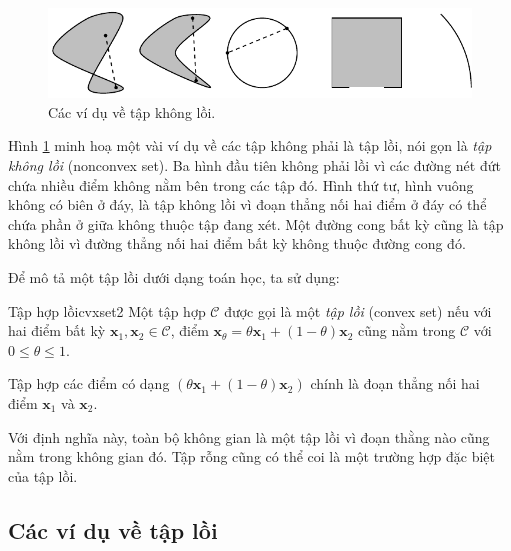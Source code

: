  

\begin{figure}[t]
\centering
    \includegraphics[width = .8\textwidth]{Chapters/08_ConvexOptimization/16_convexity/latex/nonconvexsets.pdf}
    \caption[]{Các ví dụ về tập không lồi.}
    \label{fig:16_nonconvexsets}
\end{figure}

Hình \ref{fig:16_nonconvexsets} minh hoạ một vài ví dụ về các tập không phải là
tập lồi, nói gọn là \textit{tập không lồi} ({nonconvex set}). Ba hình đầu
tiên không phải lồi vì các đường nét đứt chứa nhiều điểm không nằm bên trong các
tập đó. Hình thứ tư, hình vuông không có biên ở đáy, là tập không lồi vì đoạn thẳng nối hai điểm ở đáy có thể chứa phần ở giữa không
thuộc tập đang xét. Một đường cong
bất kỳ cũng là tập không lồi vì đường thẳng nối hai điểm
bất kỳ không thuộc đường cong đó.
 
Để mô tả một {tập lồi} dưới dạng toán học, ta sử dụng:

\begin{mydef}{Tập hợp lồi}{cvxset2}
Một tập hợp $\mathcal{C}$ được gọi là một {\textit{tập lồi}} (convex set) nếu với hai điểm bất
kỳ $\mathbf{x}_1, \mathbf{x}_2 \in \mathcal{C}$, điểm $ \mathbf{x}_{\theta} =
\theta \mathbf{x}_1 + (1 - \theta) \mathbf{x}_2$ cũng nằm trong $\mathcal{C}$
với $0 \leq \theta \leq 1$.
\end{mydef}

Tập hợp các điểm có dạng $\left(\theta \mathbf{x}_1 + (1 -
\theta) \mathbf{x}_2\right)$ chính là {đoạn thẳng} nối hai điểm
$\mathbf{x}_1$ và $\mathbf{x}_2$.
 
Với định nghĩa này, {toàn bộ không gian} là một {tập lồi}
vì đoạn thằng nào cũng nằm trong không gian đó. Tập rỗng cũng có thể coi là một
trường hợp đặc biệt của {tập lồi}.
 
\subsection{Các ví dụ về tập lồi}

